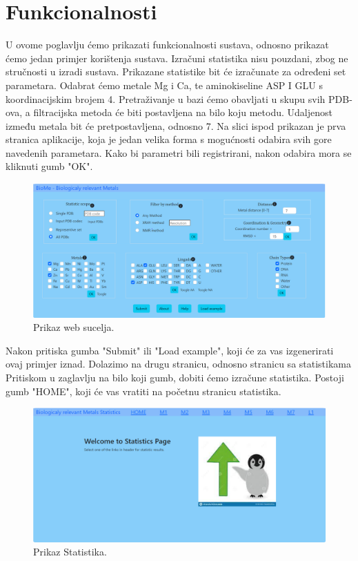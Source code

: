 \documentclass[times, utf8, zavrsni]{fer}
\begin{document}
\section{Funkcionalnosti}
U ovome poglavlju ćemo prikazati funkcionalnosti sustava, odnosno prikazat ćemo jedan primjer korištenja sustava.
Izračuni statistika nisu pouzdani, zbog ne stručnosti u izradi sustava.  Prikazane statistike bit će izračunate za određeni set parametara.
Odabrat ćemo metale Mg i Ca, te aminokiseline ASP I GLU s koordinacijskim brojem 4. Pretraživanje u bazi ćemo obavljati u skupu svih PDB-ova, a filtracijska metoda
će biti postavljena na bilo koju metodu. Udaljenost između metala bit će pretpostavljena, odnosno 7. Na slici ispod prikazan je prva stranica aplikacije, koja je jedan velika forma s mogućnosti odabira svih gore navedenih parametara. Kako bi parametri bili registrirani, nakon odabira mora se kliknuti gumb "OK".

  \begin{figure}[!htb]
	\centering
	\hspace*{-2.5cm}
	 \includegraphics[width=\dimexpr\paperwidth-2cm,height=\paperheight,keepaspectratio]
	{./img/websucelje.png}
		\centering
                      \caption{Prikaz web sucelja.}
    \end{figure}

Nakon pritiska gumba "Submit" ili "Load example", koji će za vas izgenerirati ovaj primjer iznad. Dolazimo na drugu stranicu, odnosno stranicu sa statistikama
Pritiskom u zaglavlju na bilo koji gumb, dobiti ćemo izračune statistika. Postoji gumb "HOME", koji će vas vratiti na početnu stranicu statistika.

  \begin{figure}[!htb]
	\centering
	\hspace*{-2.5cm}
	 \includegraphics[width=\dimexpr\paperwidth-2cm,height=\paperheight,keepaspectratio]
	{./img/statistics.png}
		\centering
                      \caption{Prikaz Statistika.}
    \end{figure}
\end{document}

